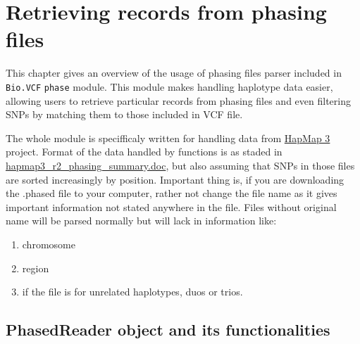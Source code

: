 \section {Retrieving records from phasing files}

This chapter gives an overview of the usage of phasing files parser included in \verb|Bio.VCF| \verb|phase| module.
This module makes handling haplotype data easier, allowing users to retrieve particular records from phasing files
and even filtering SNPs by matching them to those included in VCF file.

The whole module is specifficaly written for handling data from \href{ftp://ftp.hapmap.org/hapmap/phasing/2009-02_phaseIII/HapMap3_r2/}{HapMap 3} project.
Format of the data handled by functions is as staded in \href{ftp://ftp.hapmap.org/hapmap/phasing/2009-02_phaseIII/HapMap3_r2/hapmap3_r2_phasing_summary.doc}{hapmap3_r2_phasing_summary.doc},
but also assuming that SNPs in those files are sorted increasingly by position.
Important thing is, if you are downloading the .phased file to your computer, rather not change the file name as it gives important
information not stated anywhere in the file. Files without original name will be parsed normally but will lack in information like:
\begin{enumerate}
  \item chromosome
  \item region
  \item if the file is for unrelated haplotypes, duos or trios.
\end{enumerate}


\subsection{PhasedReader object and its functionalities}





